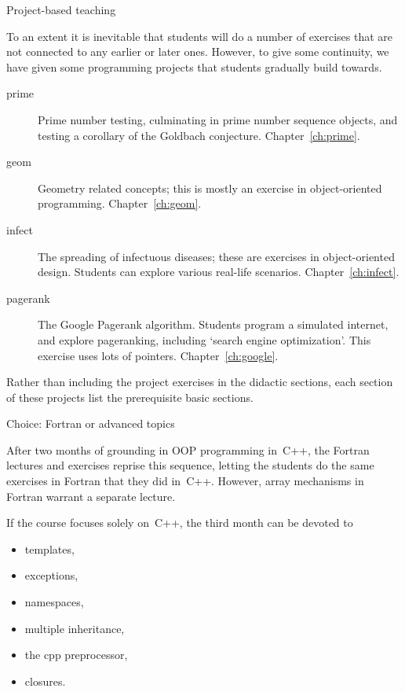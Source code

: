  {Project-based teaching}

To an extent it is inevitable that students will do a number of
exercises that are not connected to any earlier or later ones.
However, to give some continuity, we have given some programming
projects that students gradually build towards.

\begin{description}
\item[prime] Prime number testing, culminating in prime number
  sequence objects, and testing a corollary of the Goldbach
  conjecture. Chapter~\ref{ch:prime}.
\item[geom] Geometry related concepts; this is mostly an exercise in
  object-oriented programming. Chapter~\ref{ch:geom}.
\item[infect] The spreading of infectuous diseases; these are
  exercises in object-oriented design. Students can explore various
  real-life scenarios. Chapter~\ref{ch:infect}.
\item[pagerank] The Google Pagerank algorithm. Students program a
  simulated internet, and explore pageranking, including `search
  engine optimization'. This exercise uses lots of
  pointers. Chapter~\ref{ch:google}.
\end{description}

Rather than including the project exercises in the didactic sections,
each section of these projects list the prerequisite basic sections.

 {Choice: Fortran or advanced topics}

After two months of grounding in OOP programming in~C++, the Fortran
lectures and exercises reprise this sequence, letting the students do
the same exercises in Fortran that they did in~C++.  However, array
mechanisms in Fortran warrant a separate lecture.

If the course focuses solely on~C++, the third month can be devoted to
\begin{itemize}
\item templates,
\item exceptions,
\item namespaces,
\item multiple inheritance,
\item the cpp preprocessor,
\item closures.
\end{itemize}

